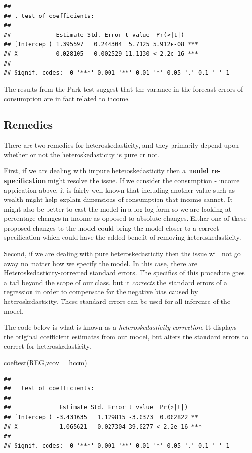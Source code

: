 \documentclass[
]{book}
\newenvironment{Shaded}{\begin{snugshade}}{\end{snugshade}}
\newcommand{\AttributeTok}[1]{\textcolor[rgb]{0.77,0.63,0.00}{#1}}
\newcommand{\FunctionTok}[1]{\textcolor[rgb]{0.00,0.00,0.00}{#1}}
\newcommand{\NormalTok}[1]{#1}
\begin{document}
\begin{verbatim}
## 
## t test of coefficients:
## 
##             Estimate Std. Error t value  Pr(>|t|)    
## (Intercept) 1.395597   0.244304  5.7125 5.912e-08 ***
## X           0.028105   0.002529 11.1130 < 2.2e-16 ***
## ---
## Signif. codes:  0 '***' 0.001 '**' 0.01 '*' 0.05 '.' 0.1 ' ' 1
\end{verbatim}

The results from the Park test suggest that the variance in the forecast errors of consumption are in fact related to income.

\hypertarget{remedies}{%
\subsection{Remedies}\label{remedies}}

There are two remedies for heteroskedasticity, and they primarily depend upon whether or not the heteroskedasticity is pure or not.

First, if we are dealing with impure heteroskedasticity then a \textbf{model re-specification} might resolve the issue. If we consider the consumption - income application above, it is fairly well known that including another value such as wealth might help explain dimensions of consumption that income cannot. It might also be better to cast the model in a log-log form so we are looking at percentage changes in income as opposed to absolute changes. Either one of these proposed changes to the model could bring the model closer to a correct specification which could have the added benefit of removing heteroskedasticity.

Second, if we are dealing with pure heteroskedasticity then the issue will not go away no matter how we specify the model. In this case, there are Heteroskedasticity-corrected standard errors. The specifics of this procedure goes a tad beyond the scope of our class, but it \emph{corrects} the standard errors of a regression in order to compensate for the negative bias caused by heteroskedasticity. These standard errors can be used for all inference of the model.

The code below is what is known as a \emph{heteroskedasticity correction}. It displays the original coefficient estimates from our model, but alters the standard errors to correct for heteroskedasticity.

\begin{Shaded}
\begin{Highlighting}[]
\FunctionTok{coeftest}\NormalTok{(REG,}\AttributeTok{vcov =}\NormalTok{ hccm)}
\end{Highlighting}
\end{Shaded}

\begin{verbatim}
## 
## t test of coefficients:
## 
##              Estimate Std. Error t value  Pr(>|t|)    
## (Intercept) -3.431635   1.129815 -3.0373  0.002822 ** 
## X            1.065621   0.027304 39.0277 < 2.2e-16 ***
## ---
## Signif. codes:  0 '***' 0.001 '**' 0.01 '*' 0.05 '.' 0.1 ' ' 1
\end{verbatim}
\end{document}
